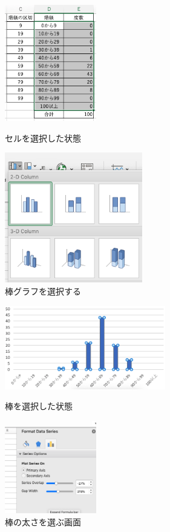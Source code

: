 \begin{figure}[htbp]
    \begin{minipage}{0.5\hsize}
        \centering
  \includegraphics[width=4cm]{chap1/select_cells_hist.png}
  \caption{セルを選択した状態}
  \label{fig:select_cells_hist}
 \end{minipage}
 \begin{minipage}{0.5\hsize}
        \centering
  \includegraphics[width=6cm]{chap1/select_barchart_hist.png}
  \caption{棒グラフを選択する}
  \label{fig:select_barchart_hist}
 \end{minipage}
\end{figure}

\begin{figure}[htbp]
    \begin{minipage}{0.5\hsize}
        \centering
        \includegraphics[width=7cm]{chap1/select_bar_hist.png}
        \caption{棒を選択した状態}
        \label{fig:select_bar_hist}
    \end{minipage}
    \begin{minipage}{0.5\hsize}
        \centering
        \includegraphics[width=4cm]{chap1/select_width_hist.png}
        \caption{棒の太さを選ぶ画面}
        \label{fig:select_width_hist}
    \end{minipage}
\end{figure}


